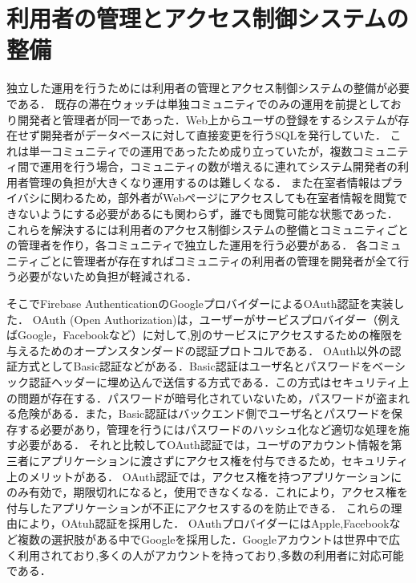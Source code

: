 

\section{利用者の管理とアクセス制御システムの整備}\label{4.2}
独立した運用を行うためには利用者の管理とアクセス制御システムの整備が必要である．
既存の滞在ウォッチは単独コミュニティでのみの運用を前提としており開発者と管理者が同一であった．Web上からユーザの登録をするシステムが存在せず開発者がデータベースに対して直接変更を行うSQLを発行していた．
これは単一コミュニティでの運用であったため成り立っていたが，複数コミュニティ間で運用を行う場合，コミュニティの数が増えるに連れてシステム開発者の利用者管理の負担が大きくなり運用するのは難しくなる．
また在室者情報はプライバシに関わるため，部外者がWebページにアクセスしても在室者情報を閲覧できないようにする必要があるにも関わらず，誰でも閲覧可能な状態であった．
これらを解決するには利用者のアクセス制御システムの整備とコミュニティごとの管理者を作り，各コミュニティで独立した運用を行う必要がある．
各コミュニティごとに管理者が存在すればコミュニティの利用者の管理を開発者が全て行う必要がないため負担が軽減される．


そこでFirebase AuthenticationのGoogleプロバイダーによるOAuth認証を実装した．
OAuth (Open Authorization)は，ユーザーがサービスプロバイダー（例えばGoogle，Facebookなど）に対して,別のサービスにアクセスするための権限を与えるためのオープンスタンダードの認証プロトコルである．
OAuth以外の認証方式としてBasic認証などがある．Basic認証はユーザ名とパスワードをベーシック認証ヘッダーに埋め込んで送信する方式である．この方式はセキュリティ上の問題が存在する．パスワードが暗号化されていないため，パスワードが盗まれる危険がある．また，Basic認証はバックエンド側でユーザ名とパスワードを保存する必要があり，管理を行うにはパスワードのハッシュ化など適切な処理を施す必要がある．
それと比較してOAuth認証では，ユーザのアカウント情報を第三者にアプリケーションに渡さずにアクセス権を付与できるため，セキュリティ上のメリットがある．
OAuth認証では，アクセス権を持つアプリケーションにのみ有効で，期限切れになると，使用できなくなる．これにより，アクセス権を付与したアプリケーションが不正にアクセスするのを防止できる．
これらの理由により，OAtuh認証を採用した．
OAuthプロバイダーにはApple,Facebookなど複数の選択肢がある中でGoogleを採用した．Googleアカウントは世界中で広く利用されており,多くの人がアカウントを持っており,多数の利用者に対応可能である．

